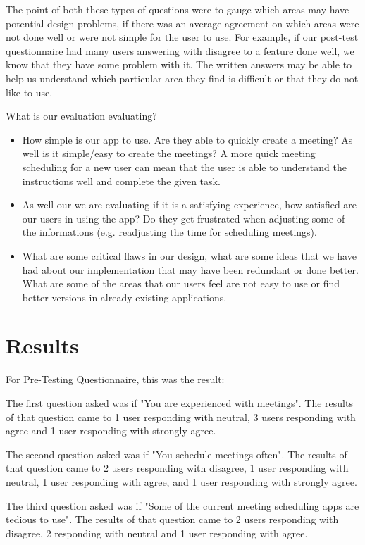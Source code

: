 \documentclass{sigchi}
\begin{document}
The point of both these types of questions were to gauge which areas may have potential design problems, if there was an average agreement on which areas were not done well or were not simple for the user to use. For example, if our post-test questionnaire had many users answering with disagree to a feature done well, we know that they have some problem with it. The written answers may be able to help us understand which particular area they find is difficult or that they do not like to use.

What is our evaluation evaluating?
\begin{itemize}
	\item How simple is our app to use. Are they able to quickly create a meeting? As well is it simple/easy to create the meetings? A more quick meeting scheduling for a new user can mean that the user is able to understand the instructions well and complete the given task.

	\item As well our we are evaluating if it is a satisfying experience, how satisfied are our users in using the app? Do they get frustrated when adjusting some of the informations (e.g. readjusting the time for scheduling meetings).

	\item What are some critical flaws in our design, what are some ideas that we have had about our implementation that may have been redundant or done better. What are some of the areas that our users feel are not easy to use or find better versions in already existing applications.
\end{itemize}

\section{Results}

For Pre-Testing Questionnaire, this was the result:

The first question asked was if "You are experienced with meetings". The results of that question came to 1 user responding with neutral, 3 users responding with agree and 1 user responding with strongly agree.

The second question asked was if "You schedule meetings often". The results of that question came to 2 users responding with disagree, 1 user responding with neutral, 1 user responding with agree, and 1 user responding with strongly agree.

The third question asked was if "Some of the current meeting scheduling apps are tedious to use". The results of that question came to 2 users responding with disagree, 2 responding with neutral and 1 user responding with agree.
\end{document}
